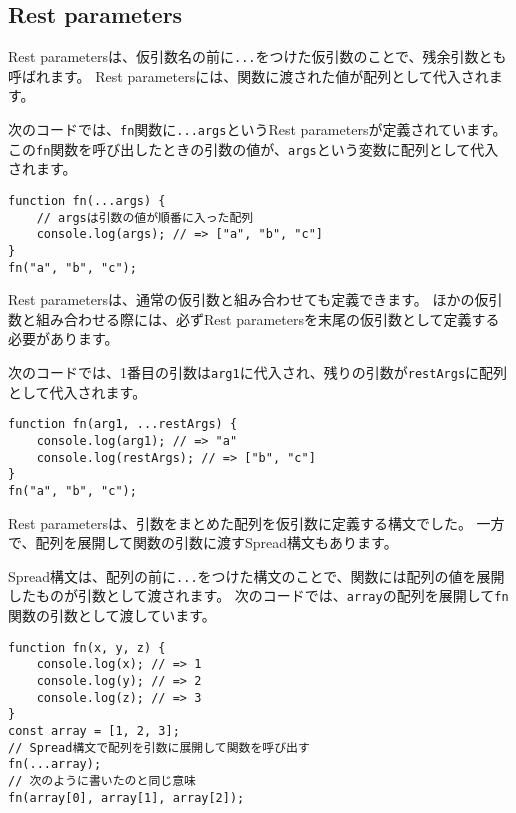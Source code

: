 \hypertarget{rest-parameters}{%
\subsection[Rest parameters]{Rest parameters\,\protect{}}\label{rest-parameters}}

Rest
parametersは、仮引数名の前に\texttt{...}をつけた仮引数のことで、残余引数とも呼ばれます。
Rest parametersには、関数に渡された値が配列として代入されます。

次のコードでは、\texttt{fn}関数に\texttt{...args}というRest
parametersが定義されています。
この\texttt{fn}関数を呼び出したときの引数の値が、\texttt{args}という変数に配列として代入されます。

\begin{lstlisting}
function fn(...args) {
    // argsは引数の値が順番に入った配列
    console.log(args); // => ["a", "b", "c"]
}
fn("a", "b", "c");
\end{lstlisting}

Rest parametersは、通常の仮引数と組み合わせても定義できます。
ほかの仮引数と組み合わせる際には、必ずRest
parametersを末尾の仮引数として定義する必要があります。

次のコードでは、1番目の引数は\texttt{arg1}に代入され、残りの引数が\texttt{restArgs}に配列として代入されます。

\begin{lstlisting}
function fn(arg1, ...restArgs) {
    console.log(arg1); // => "a"
    console.log(restArgs); // => ["b", "c"]
}
fn("a", "b", "c");
\end{lstlisting}

Rest parametersは、引数をまとめた配列を仮引数に定義する構文でした。
一方で、配列を展開して関数の引数に渡すSpread構文もあります。

Spread構文は、配列の前に\texttt{...}をつけた構文のことで、関数には配列の値を展開したものが引数として渡されます。
次のコードでは、\texttt{array}の配列を展開して\texttt{fn}関数の引数として渡しています。

\begin{lstlisting}
function fn(x, y, z) {
    console.log(x); // => 1 
    console.log(y); // => 2 
    console.log(z); // => 3 
}
const array = [1, 2, 3];
// Spread構文で配列を引数に展開して関数を呼び出す
fn(...array);
// 次のように書いたのと同じ意味
fn(array[0], array[1], array[2]);
\end{lstlisting}

